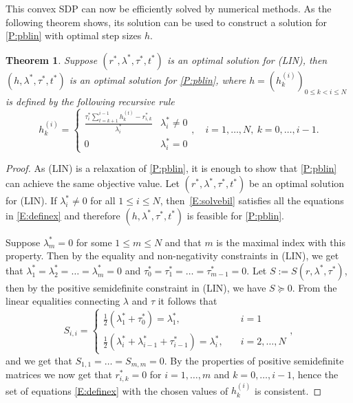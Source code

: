 \documentclass[12pt]{article}
\numberwithin{equation}{section}
\newtheorem{theorem}{Theorem}[section]
\theoremstyle{definition}
\theoremstyle{remark}
\begin{document}
This convex SDP can now be efficiently solved by numerical methods. As the following theorem
shows, its solution can be used to construct a solution for \eqref{P:pblin} with optimal step
sizes $h$.
\begin{theorem}
Suppose $(r^\ast,\lambda^\ast,\tau^\ast,t^\ast)$ is an optimal solution for (LIN),
then $(h,\lambda^\ast,\tau^\ast,t^\ast)$ is an optimal solution for \eqref{P:pblin}, where
$h=(h_k^{(i)})_{0\leq k<i \leq N}$ is defined by the following recursive rule
\begin{equation}\label{E:solvebil}
    h_k^{(i)} = \begin{cases}
            \frac{\tau_i^\ast \sum_{t=k+1}^{i-1} h_k^{(t)} -r_{i,k}^\ast }{\lambda_{i}^\ast} & \lambda_i^\ast \neq 0\\
            0   & \lambda_i^\ast = 0
        \end{cases},  \quad i=1,\dots,N,\ k=0,\dots,i-1.
\end{equation}
\end{theorem}
\begin{proof}
As (LIN) is a relaxation of \eqref{P:pblin}, it is enough to show that \eqref{P:pblin} can achieve the same
objective value. Let $(r^\ast,\lambda^\ast,\tau^\ast,t^\ast)$ be an optimal solution
for (LIN). If $\lambda_i^\ast \neq 0$ for all $1\leq i \leq N$, then~\eqref{E:solvebil}
satisfies all the equations in \eqref{E:definex} and therefore
$(h,\lambda^\ast,\tau^\ast,t^\ast)$ is feasible for \eqref{P:pblin}.

Suppose $\lambda^\ast_m=0$ for some $1\leq m \leq N$ and that $m$ is the maximal index with
this property. Then by the equality and non-negativity constraints in (LIN), we get that
$\lambda^\ast_1=\lambda^\ast_2=\dots=\lambda^\ast_m=0$ and
$\tau^\ast_0=\tau^\ast_1=\dots=\tau^\ast_{m-1}=0$.
Let $S:=S(r,\lambda^\ast,\tau^\ast)$, then by the positive semidefinite constraint in (LIN), we have $S \succeq 0$.
From the linear equalities connecting $\lambda$ and $\tau$ it follows that
\[
    S_{i,i}=\begin{cases}
            \frac{1}{2} (\lambda_1^\ast+\tau_0^\ast) = \lambda_1^\ast, &\quad i=1 \\
            \frac{1}{2} (\lambda_i^\ast+\lambda_{i-1}^\ast+\tau_{i-1}^\ast) = \lambda_i^\ast, &\quad i=2,\dots,N
        \end{cases},
\]
and we get that $S_{1,1}=\dots=S_{m,m}=0$. By the properties of positive semidefinite matrices we now get that $r_{i,k}^\ast=0$ for $i=1,\dots,m$ and $k=0,\dots,i-1$,
hence the set of equations \eqref{E:definex} with the chosen values of $h_k^{(i)}$ is consistent.
\end{proof}
\end{document}
